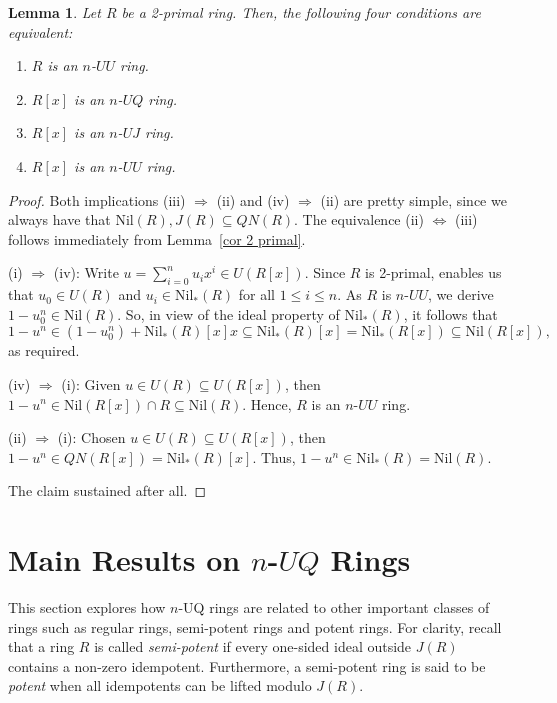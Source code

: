\documentclass[12pt]{amsart}
\newtheorem{lemma}[theorem]{Lemma}
\theoremstyle{definition}
\begin{document}
\begin{lemma}
Let $R$ be a 2-primal ring. Then, the following four conditions are equivalent:
\begin{enumerate}
\item
$R$ is an $n$-$UU$ ring.
\item
$R[x]$ is an $n$-$UQ$ ring.
\item
$R[x]$ is an $n$-$UJ$ ring.
\item
$R[x]$ is an $n$-$UU$ ring.
\end{enumerate}
\end{lemma}

\begin{proof}
Both implications (iii) \( \Rightarrow \) (ii) and (iv) \( \Rightarrow \) (ii) are pretty simple, since we always have that \( \text{Nil}(R), J(R) \subseteq QN(R) \). The equivalence (ii) \( \Leftrightarrow \) (iii) follows immediately from Lemma~\ref{cor 2 primal}.

(i) \( \Rightarrow \) (iv): Write \( u = \sum_{i=0}^n u_i x^i \in U(R[x]) \). Since \( R \) is 2-primal, \cite[Theorem 2.5]{Chenpr} enables us that \( u_0 \in U(R) \) and \( u_i \in \text{Nil}_*(R) \) for all \( 1 \leq i \leq n \).
As \( R \) is $n$-$UU$, we derive \( 1 - u_0^n \in \text{Nil}(R) \). So, in view of the ideal property of \( \text{Nil}_*(R) \), it follows that
\[
1 - u^n \in (1 - u_0^n) + \text{Nil}_*(R)[x]x \subseteq \text{Nil}_*(R)[x] = \text{Nil}_*(R[x]) \subseteq \text{Nil}(R[x]),
\]
as required.

(iv) \( \Rightarrow \) (i): Given \( u \in U(R) \subseteq U(R[x]) \), then \( 1 - u^n \in \text{Nil}(R[x]) \cap R \subseteq \text{Nil}(R) \). Hence, \( R \) is an $n$-$UU$ ring.

(ii) \( \Rightarrow \) (i): Chosen \( u \in U(R) \subseteq U(R[x]) \), then \( 1 - u^n \in QN(R[x]) = \text{Nil}_*(R)[x] \). Thus, \( 1 - u^n \in \text{Nil}_*(R) = \text{Nil}(R) \).

The claim sustained after all.
\end{proof}

\section{Main Results on $n$-$UQ$ Rings}

This section explores how $n$-UQ rings are related to other important classes of rings such as regular rings, semi-potent rings and potent rings. For clarity, recall that a ring $R$ is called {\it semi-potent} if every one-sided ideal outside $J(R)$ contains a non-zero idempotent. Furthermore, a semi-potent ring is said to be {\it potent} when all idempotents can be lifted modulo $J(R)$.
\end{document}
